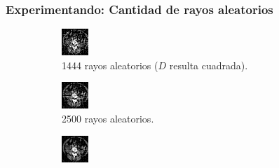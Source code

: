 \documentclass{beamer}
\begin{document}
\begin{frame}
\frametitle{Experimentando: Cantidad de rayos aleatorios}
\begin{figure}
\centering
\begin{subfigure}{0.4\linewidth}
  \centering
  \includegraphics[width=0.6\linewidth]{rayos/tomo3-aleat1444}
  \caption{1444 rayos aleatorios ($D$ resulta cuadrada).}
\end{subfigure}%
\begin{subfigure}{0.4\linewidth}
  \centering
  \includegraphics[width=0.6\linewidth]{rayos/tomo3-aleat2500}
  \caption{2500 rayos aleatorios.}
\end{subfigure}
\begin{subfigure}{0.4\linewidth}
  \centering
  \includegraphics[width=0.6\linewidth]{rayos/tomo3-aleat4000}

\end{subfigure}
\end{figure}
\end{frame}
\end{document}
